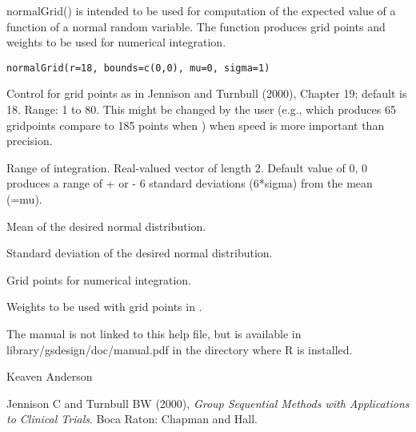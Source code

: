 \begin{Description}\relax
normalGrid() is intended to be used for computation of the expected value of 
a function of a normal random variable.
The function produces grid points and weights to be used for numerical integration.
\end{Description}
\begin{Usage}
\begin{verbatim}
normalGrid(r=18, bounds=c(0,0), mu=0, sigma=1)
\end{verbatim}
\end{Usage}
\begin{Arguments}
\begin{ldescription}
\item[\code{r}] Control for grid points as in Jennison and Turnbull (2000), Chapter 19; default is 18. Range: 1 to 80.
This might be changed by the user (e.g.,  which produces 65 gridpoints compare to 185 points when )
when speed is more important than precision.
\item[\code{bounds}] Range of integration. Real-valued vector of length 2. Default value of 0, 0 produces a range 
of + or - 6 standard deviations (6*sigma) from the mean (=mu).
\item[\code{mu}] Mean of the desired normal distribution.
\item[\code{sigma}] Standard deviation of the desired normal distribution.
\end{ldescription}
\end{Arguments}
\begin{Value}
\begin{ldescription}
\item[\code{z}] Grid points for numerical integration.
\item[\code{wgts}] Weights to be used with grid points in .
\end{ldescription}
\end{Value}
\begin{Note}\relax
The manual is not linked to this help file, but is available in library/gsdesign/doc/manual.pdf
in the directory where R is installed.
\end{Note}
\begin{Author}\relax
Keaven Anderson 
\end{Author}
\begin{References}\relax
Jennison C and Turnbull BW (2000), \emph{Group Sequential Methods with Applications to Clinical Trials}.
Boca Raton: Chapman and Hall.
\end{References}
